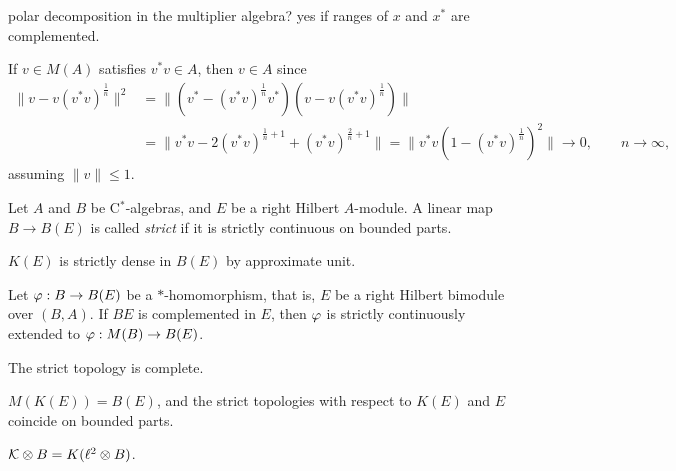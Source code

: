 \documentclass{../../large}
\begin{document}
polar decomposition in the multiplier algebra? yes if ranges of $x$ and $x^*$ are complemented.

If $v\in M(A)$ satisfies $v^*v\in A$, then $v\in A$ since
\begin{align*}
\|v-v(v^*v)^{\frac1n}\|^2
&=\|(v^*-(v^*v)^{\frac1n}v^*)(v-v(v^*v)^{\frac1n})\|\\
&=\|v^*v-2(v^*v)^{\frac1n+1}+(v^*v)^{\frac2n+1}\|=\|v^*v(1-(v^*v)^{\frac1n})^2\|\to0,\qquad n\to\infty,
\end{align*}
assuming $\|v\|\le1$.




\begin{prb}
Let $A$ and $B$ be C$^*$-algebras, and $E$ be a right Hilbert $A$-module.
A linear map $B\to B(E)$ is called \emph{strict} if it is strictly continuous on bounded parts.
\begin{parts}
\item $K(E)$ is strictly dense in $B(E)$ by approximate unit.
\item Let $\varphi:B\to B(E)$ be a $*$-homomorphism, that is, $E$ be a right Hilbert bimodule over $(B,A)$. If $BE$ is complemented in $E$, then $\varphi$ is strictly continuously extended to $\varphi:M(B)\to B(E)$.
\item The strict topology is complete.
\item $M(K(E))=B(E)$, and the strict topologies with respect to $K(E)$ and $E$ coincide on bounded parts.
\item $\mathcal{K}\otimes B=K(\ell^2\otimes B)$.
\end{parts}
\end{prb}
\end{document}
